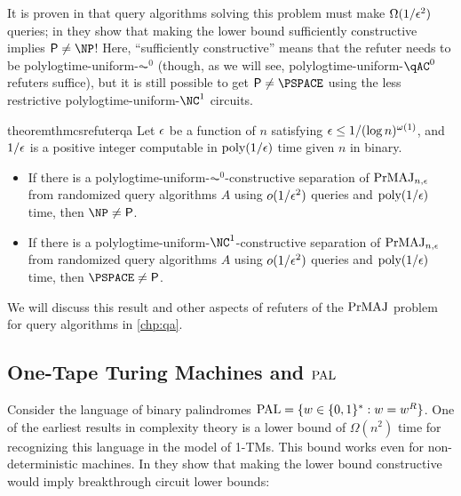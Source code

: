 It is proven in \cite{Canetti95} that query algorithms solving this problem must make $\Omega(1/\epsilon^2)$ 
queries; in \cite{ConstructiveSeparations} they show that making the lower bound sufficiently constructive
implies $\PTIME \neq \NP$! Here, ``sufficiently constructive'' means that the refuter needs to be 
polylogtime-uniform-$\AC^0$ (though, as we will see, polylogtime-uniform-$\qAC^0$ refuters suffice), but
it is still possible to get $\PTIME \neq \PSPACE$ using the less restrictive polylogtime-uniform-$\NC^1$ circuits.

\begin{restatable}{theorem}{thmcsrefuterqa}\label{thm:csrefuterqa} 
	Let $\epsilon$ be a function of $n$ satisfying $\epsilon \leq 1/(\log n)^{\omega(1)}$, and $1/\epsilon$ is a positive integer
     computable in $\text{poly}(1/\epsilon)$ time given $n$ in binary.
	\begin{itemize}
		\item If there is a polylogtime-uniform-$\AC^0$-constructive separation of $\mathrm{PrMAJ}_{n,\epsilon}$ from randomized
         query algorithms $A$ using $o(1/\epsilon^2)$ queries and $\text{poly}(1/\epsilon)$ time, then $\NP \ne \PTIME$.
		\item If there is a polylogtime-uniform-$\NC^1$-constructive separation of $\mathrm{PrMAJ}_{n,\epsilon}$ from randomized
         query algorithms $A$ using $o(1/\epsilon^2)$ queries and $\text{poly}(1/\epsilon)$ time, then $\PSPACE \ne \PTIME$.
	\end{itemize}
\end{restatable}

We will discuss this result and other aspects of refuters of the $\mathrm{PrMAJ}$ problem 
for query algorithms in \cref{chp:qa}.

\subsection{One-Tape Turing Machines and $\mathrm{PAL}$}

Consider the language of binary palindromes $\mathrm{PAL} = \{w \in \{0, 1\}^* : w = w^R\}$. One of the 
earliest results in complexity theory is a lower bound of $\Omega(n^2)$ time for recognizing 
this language in the model of 1-TMs. This bound works even for non-deterministic machines. 
In \cite{ConstructiveSeparations} they show that making the lower bound constructive
would imply breakthrough circuit lower bounds:

